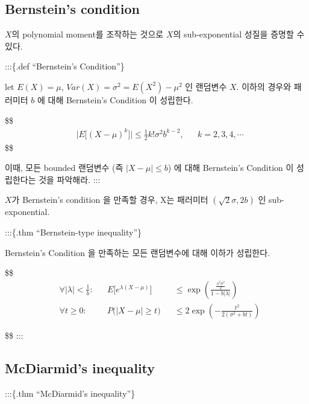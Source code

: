 \documentclass[
]{book}
\begin{document}
{{{\hypertarget{bernsteins-condition}{%
\subsection{Bernstein's condition}\label{bernsteins-condition}}

\(X\)의 polynomial moment를 조작하는 것으로 \(X\)의 sub-exponential 성질을 증명할 수 있다.

:::\{.def ``Bernstein's Condition''\}

let \(E(X) = \mu\), \(Var(X) = \sigma^2 = E(X^2) - \mu^2\) 인 랜덤변수 \(X\). 이하의 경우와 패러미터 \(b\) 에 대해 Bernstein's Condition 이 성립한다.

\$\$
\begin{align}

&\Bigg | E \Big [ (X-\mu)^k \Big ] \Bigg | \le \frac{1}{2} k! \sigma^2 b^{k-2}, && k = 2, 3, 4, \cdots

\end{align}
\$\$

이때, 모든 bounded 랜덤변수 (즉 \(|X-\mu| \le b\)) 에 대해 Bernstein's Condition 이 성립한다는 것을 파악해라.
:::

\(X\)가 Bernstein's condition 을 만족할 경우, X는 패러미터 \((\sqrt 2 \sigma, 2b)\) 인 sub-exponential.

:::\{.thm ``Bernstein-type inequality''\}

Bernstein's Condition 을 만족하는 모든 랜덤변수에 대해 이하가 성립한다.

\$\$
\begin{align}



&\forall |\lambda|< \tfrac{1}{b}: &&E \Big [ e^{\lambda(X-\mu)}\Big ] &&\le \exp \left( \frac{\frac{\lambda^2 \sigma^2}{2}}{1-b|\lambda|}\right)

\\

&\forall t \ge 0:

&&P \Big( |X-\mu| \ge t \Big) &&\le 2 \exp \left( - \frac{t^2}{2(\sigma^2 + bt)}\right)

\end{align}

\$\$
:::

\hypertarget{mcdiarmids-inequality}{%
\subsection{McDiarmid's inequality}\label{mcdiarmids-inequality}}

:::\{.thm ``McDiarmid's inequality''\}

}}}
\end{document}

